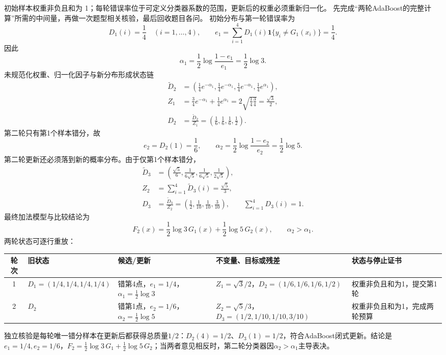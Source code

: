 \begin{solution}
\SolGiven 初始样本权重非负且和为 1；每轮错误率位于可定义分类器系数的范围，更新后的权重必须重新归一化。
\SolPlan 先完成“两轮AdaBoost的完整计算”所需的中间量，再做一次题型相关核验，最后回收题目各问。
\SolDerive
初始分布与第一轮错误率为
\[
D_1(i)=\frac14\quad(i=1,\ldots,4),
\qquad
e_1=\sum_{i=1}^{4}D_1(i)\mathbf1\{y_i\neq G_1(x_i)\}=\frac14.
\]
因此
\[
\alpha_1
=\frac12\log\frac{1-e_1}{e_1}
=\frac12\log3.
\]
未规范化权重、归一化因子与新分布形成状态链
\[
\begin{aligned}
\widetilde D_2
&=\left(\frac14e^{-\alpha_1},\frac14e^{-\alpha_1},
\frac14e^{-\alpha_1},\frac14e^{\alpha_1}\right),\\
Z_1
&=\frac34e^{-\alpha_1}+\frac14e^{\alpha_1}
=2\sqrt{\frac14\frac34}=\frac{\sqrt3}{2},\\
D_2&=\frac{\widetilde D_2}{Z_1}
=\left(\frac16,\frac16,\frac16,\frac12\right).
\end{aligned}
\]
第二轮只有第1个样本错分，故
\[
e_2=D_2(1)=\frac16,
\qquad
\alpha_2=\frac12\log\frac{1-e_2}{e_2}
=\frac12\log5.
\]
第二轮更新还必须落到新的概率分布。由于仅第1个样本错分，
\[
\begin{aligned}
\widetilde D_3
&=\left(\frac{\sqrt5}{6},
\frac{1}{6\sqrt5},
\frac{1}{6\sqrt5},
\frac{1}{2\sqrt5}\right),\\
Z_2&=\sum_{i=1}^{4}\widetilde D_3(i)
=\frac{\sqrt5}{3},\\
D_3&=\frac{\widetilde D_3}{Z_2}
=\left(\frac12,\frac1{10},\frac1{10},\frac3{10}\right),
\qquad \sum_{i=1}^{4}D_3(i)=1.
\end{aligned}
\]
最终加法模型与比较结论为
\[
F_2(x)=\frac12\log3\,G_1(x)+\frac12\log5\,G_2(x),
\qquad
\alpha_2>\alpha_1.
\]
两轮状态可逐行重放：
\begin{center}
\begin{tabularx}{\linewidth}{@{}c X X X X@{}}
\toprule
轮次 & 旧状态 & 候选/更新 & 不变量、目标或残差 & 状态与停止证书\\
\midrule
1 & $D_1=(1/4,1/4,1/4,1/4)$ & 错第4点，$e_1=1/4$，$\alpha_1=\tfrac12\log3$ & $Z_1=\sqrt3/2$，$D_2=(1/6,1/6,1/6,1/2)$ & 权重非负且和为1，提交第1轮\\
2 & $D_2$ & 错第1点，$e_2=1/6$，$\alpha_2=\tfrac12\log5$ & $Z_2=\sqrt5/3$，$D_3=(1/2,\allowbreak 1/10,\allowbreak 1/10,\allowbreak 3/10)$ & 权重非负且和为1，完成两轮预算\\
\bottomrule
\end{tabularx}
\end{center}
独立核验是每轮唯一错分样本在更新后都获得总质量$1/2$：$D_2(4)=1/2$、$D_3(1)=1/2$，符合AdaBoost闭式更新。结论是$e_1=1/4,e_2=1/6$，$F_2=\tfrac12\log3\,G_1+\tfrac12\log5\,G_2$；当两者意见相反时，第二轮分类器因$\alpha_2>\alpha_1$主导表决。
\end{solution}

